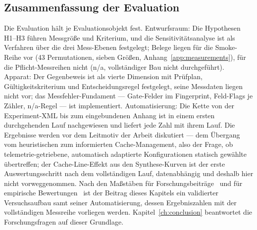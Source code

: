 \begin{nurlang}
\subsection{Zusammenfassung der Evaluation}\label{sec:eval-summary}
Die Evaluation hält je Evaluationsobjekt fest. Entwurfsraum: Die Hypothesen H1--H3 führen Messgröße und
Kriterium, und die Sensitivitätsanalyse ist als Verfahren über die drei Mess-Ebenen festgelegt; Belege
liegen für die Smoke-Reihe vor (43 Permutationen, sieben Größen, Anhang~\ref{app:measurements}), für die
Pflicht-Messreihen nicht (n/a, vollständiger Bau nicht durchgeführt). Apparat: Der Gegenbeweis ist als vierte Dimension
mit Prüfplan, Gültigkeitskriterium und Entscheidungsregel festgelegt, seine Messdaten liegen nicht vor;
das Messfehler-Fundament --- Gate-Felder im Fingerprint, Feld-Flags je Zähler, n/a-Regel --- ist
implementiert. Automatisierung: Die Kette von der Experiment-XML bis zum eingebundenen Anhang ist in
einem ersten durchgehenden Lauf nachgewiesen und liefert jede Zahl mit ihrem Lauf. Die Ergebnisse werden vor dem
Leitmotiv der Arbeit diskutiert --- dem Übergang vom heuristischen zum informierten Cache-Management,
also der Frage, ob telemetrie-getriebene, automatisch adaptierte Konfigurationen statisch gewählte
übertreffen; der Cache-Line-Effekt aus den Synthese-Kurven ist der erste Auswertungsschritt nach dem
vollständigen Lauf, datenabhängig und deshalb hier nicht vorweggenommen. Nach den Maßstäben für
Forschungsbeiträge~\cite{shaw2003writing} und für empirische Bewertungen~\cite{blackburn2016truth} ist
der Beitrag dieses Kapitels ein validierter Versuchsaufbau samt seiner Automatisierung, dessen
Ergebniszahlen mit der vollständigen Messreihe vorliegen werden. Kapitel~\ref{ch:conclusion} beantwortet die Forschungsfragen auf
dieser Grundlage.
\end{nurlang}
